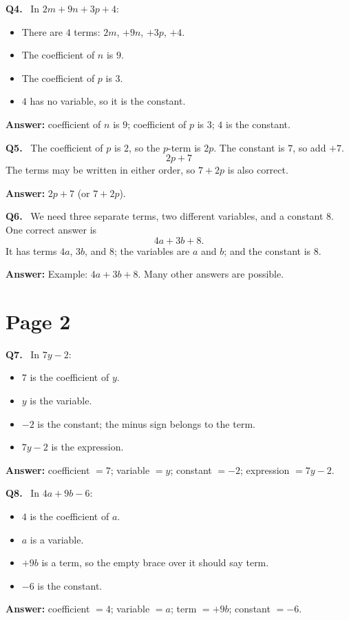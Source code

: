 \documentclass[12pt,a4paper]{article}
\newcommand{\solQ}[1]{\textbf{#1.}\ }
\newcommand{\ans}[1]{\par\noindent\textbf{Answer: }#1\par}
\begin{document}
\begin{solbox}
\solQ{Q4} In \(2m+9n+3p+4\):
\begin{itemize}
  \item There are \(4\) terms: \(2m\), \(+9n\), \(+3p\), \(+4\).
  \item The coefficient of \(n\) is \(9\).
  \item The coefficient of \(p\) is \(3\).
  \item \(4\) has no variable, so it is the constant.
\end{itemize}
\ans{coefficient of \(n\) is \(9\); coefficient of \(p\) is \(3\); \(4\) is the constant.}
\end{solbox}

\begin{solbox}
\solQ{Q5} The coefficient of \(p\) is \(2\), so the \(p\)-term is \(2p\). The constant is \(7\), so add \(+7\).
\[
2p+7
\]
The terms may be written in either order, so \(7+2p\) is also correct.
\ans{\(2p+7\) (or \(7+2p\)).}
\end{solbox}

\begin{solbox}
\solQ{Q6} We need three separate terms, two different variables, and a constant \(8\). One correct answer is
\[
4a+3b+8.
\]
It has terms \(4a\), \(3b\), and \(8\); the variables are \(a\) and \(b\); and the constant is \(8\).
\ans{Example: \(4a+3b+8\). Many other answers are possible.}
\end{solbox}

\section*{Page 2}

\begin{solbox}
\solQ{Q7} In \(7y-2\):
\begin{itemize}
  \item \(7\) is the coefficient of \(y\).
  \item \(y\) is the variable.
  \item \(-2\) is the constant; the minus sign belongs to the term.
  \item \(7y-2\) is the expression.
\end{itemize}
\ans{coefficient \(=7\); variable \(=y\); constant \(=-2\); expression \(=7y-2\).}
\end{solbox}

\begin{solbox}
\solQ{Q8} In \(4a+9b-6\):
\begin{itemize}
  \item \(4\) is the coefficient of \(a\).
  \item \(a\) is a variable.
  \item \(+9b\) is a term, so the empty brace over it should say term.
  \item \(-6\) is the constant.
\end{itemize}
\ans{coefficient \(=4\); variable \(=a\); term \(=+9b\); constant \(=-6\).}
\end{solbox}
\end{document}
